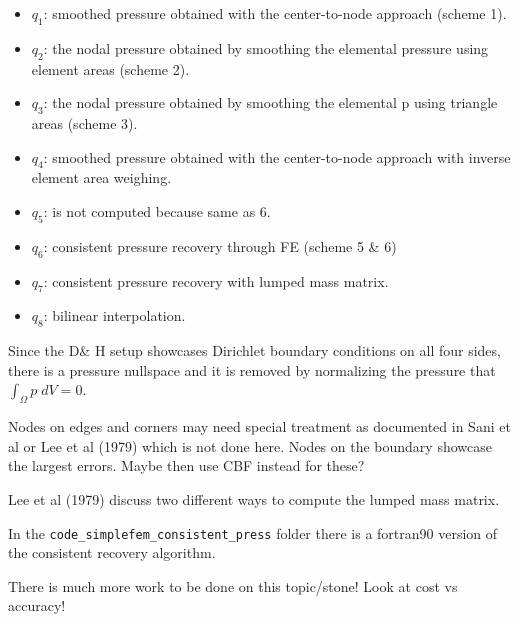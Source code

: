 \begin{itemize}
\item $q_1$: smoothed pressure obtained with the  center-to-node approach (scheme 1).

\item $q_2$: the nodal pressure obtained by smoothing the elemental pressure using element areas (scheme 2).

\item $q_3$: the nodal pressure obtained by smoothing the elemental p using triangle areas (scheme 3).

\item $q_4$: smoothed pressure obtained with the center-to-node approach with inverse element area weighing.

\item $q_5$: is not computed because same as 6.

\item $q_6$: consistent pressure recovery through FE (scheme 5 \& 6)

\item $q_7$: consistent pressure recovery with lumped mass matrix. 

\item $q_8$: bilinear interpolation. 

\end{itemize}

Since the D\& H setup showcases Dirichlet boundary conditions on all four sides, 
there is a pressure nullspace and it is removed 
by normalizing the pressure that $\int_\Omega p\; dV =0 $.

\begin{remark}
Nodes on edges and corners may need special treatment as documented in Sani et al \cite{sagl81a} or
Lee et al (1979) \cite{legs79} which is not done here.  
Nodes on the boundary showcase the largest errors. Maybe then use CBF instead for these?
\end{remark}

\begin{remark}
Lee et al (1979) \cite{legs79} discuss two different ways to compute the lumped mass matrix. 
\end{remark}

\begin{remark}
In the {\tt code\_simplefem\_consistent\_press} folder there is a fortran90 
version of the consistent recovery algorithm.
\end{remark}

There is much more work to be done on this topic/stone! Look at cost vs accuracy!

